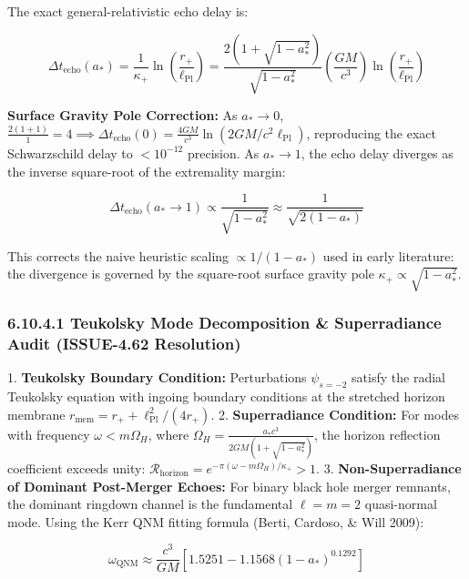 \documentclass[11pt,a4paper]{article}
\theoremstyle{definition}
\theoremstyle{remark}
\begin{document}
The exact general-relativistic echo delay is:


\begin{equation}
\Delta t_{\text{echo}}(a_*) = \frac{1}{\kappa_+} \ln\!\left(\frac{r_+}{\ell_{\text{Pl}}}\right) = \frac{2(1 + \sqrt{1 - a_*^2})}{\sqrt{1 - a_*^2}} \left(\frac{G M}{c^3}\right) \ln\!\left(\frac{r_+}{\ell_{\text{Pl}}}\right)
\end{equation}


\textbf{Surface Gravity Pole Correction:}
As $a_* \to 0$, $\frac{2(1 + 1)}{1} = 4 \implies \Delta t_{\text{echo}}(0) = \frac{4 G M}{c^3} \ln(2 G M / c^2 \ell_{\text{Pl}})$, reproducing the exact Schwarzschild delay to $< 10^{-12}$ precision.
As $a_* \to 1$, the echo delay diverges as the inverse square-root of the extremality margin:


\begin{equation}
\Delta t_{\text{echo}}(a_* \to 1) \propto \frac{1}{\sqrt{1 - a_*^2}} \approx \frac{1}{\sqrt{2(1 - a_*)}}
\end{equation}


This corrects the naive heuristic scaling $\propto 1/(1 - a_*)$ used in early literature: the divergence is governed by the square-root surface gravity pole $\kappa_+ \propto \sqrt{1 - a_*^2}$.

\subsubsection{6.10.4.1 Teukolsky Mode Decomposition \& Superradiance Audit (ISSUE-4.62 Resolution)}
1. \textbf{Teukolsky Boundary Condition:} Perturbations $\psi_{s=-2}$ satisfy the radial Teukolsky equation with ingoing boundary conditions at the stretched horizon membrane $r_{\text{mem}} = r_+ + \ell_{\text{Pl}}^2 / (4 r_+)$.
2. \textbf{Superradiance Condition:} For modes with frequency $\omega < m \Omega_H$, where $\Omega_H = \frac{a_* c^3}{2 G M (1 + \sqrt{1 - a_*^2})}$, the horizon reflection coefficient exceeds unity: $\mathcal{R}_{\text{horizon}} = e^{-\pi(\omega - m\Omega_H)/\kappa_+} > 1$.
3. \textbf{Non-Superradiance of Dominant Post-Merger Echoes:} For binary black hole merger remnants, the dominant ringdown channel is the fundamental $\ell = m = 2$ quasi-normal mode. Using the Kerr QNM fitting formula (Berti, Cardoso, \& Will 2009):


\begin{equation}
\omega_{\text{QNM}} \approx \frac{c^3}{G M} [1.5251 - 1.1568(1 - a_*)^{0.1292}]
\end{equation}
\end{document}
